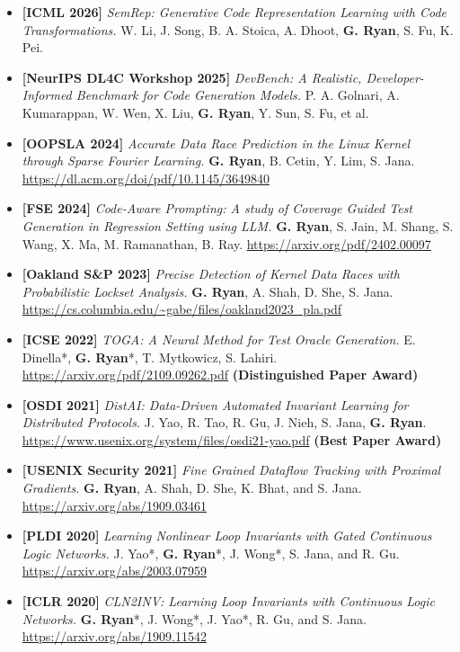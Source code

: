 \documentclass{article} %
\begin{document}
\hspace*{-0.1cm}
\begin{minipage}{1.01\linewidth}
\begin{itemize}[label={},itemindent=-2em,leftmargin=2em, parsep=5pt]
  \item {\bf [ICML 2026]}
    \textit{SemRep: Generative Code Representation Learning with Code Transformations.}
    W. Li, J. Song, B. A. Stoica, A. Dhoot, \textbf{G. Ryan}, S. Fu, K. Pei.
  \item {\bf [NeurIPS DL4C Workshop 2025]}
    \textit{DevBench: A Realistic, Developer-Informed Benchmark for Code Generation Models.}
    P. A. Golnari, A. Kumarappan, W. Wen, X. Liu, \textbf{G. Ryan}, Y. Sun, S. Fu, et al.
  \item {\bf [OOPSLA 2024]}
  \textit{Accurate Data Race Prediction in the Linux Kernel through Sparse Fourier Learning.} 
    \textbf{G. Ryan}, B. Cetin, Y. Lim, S. Jana. \url{https://dl.acm.org/doi/pdf/10.1145/3649840}
  \item {\bf [FSE 2024]}
    \textit{Code-Aware Prompting: A study of Coverage Guided Test Generation in Regression Setting using LLM.} 
      \textbf{G. Ryan}, S. Jain, M. Shang, S. Wang, X. Ma, M. Ramanathan, B. Ray. \url{https://arxiv.org/pdf/2402.00097}
  \item {\bf [Oakland S\&P 2023]}
  \textit{Precise Detection of Kernel Data Races with Probabilistic Lockset Analysis.}
    \textbf{G. Ryan}, A. Shah, D. She, S. Jana. \url{https://cs.columbia.edu/~gabe/files/oakland2023_pla.pdf}
  \item {\bf [ICSE 2022]}
    \textit{TOGA: A Neural Method for Test Oracle Generation.}
    E. Dinella*, \textbf{G. Ryan}*, T. Mytkowicz, S. Lahiri. \url{https://arxiv.org/pdf/2109.09262.pdf} \textbf{(Distinguished Paper Award)}
  \item {\bf [OSDI 2021]}
    \textit{DistAI: Data-Driven Automated Invariant Learning for Distributed Protocols.}
    J. Yao, R. Tao, R. Gu, J. Nieh, S. Jana, \textbf{G. Ryan}. \url{https://www.usenix.org/system/files/osdi21-yao.pdf} \textbf{(Best Paper Award)}
  \item {\bf [USENIX Security 2021]}
    \textit{Fine Grained Dataflow Tracking with Proximal Gradients.}
    \textbf{G. Ryan}, A. Shah, D. She, K. Bhat, and S. Jana. \url{https://arxiv.org/abs/1909.03461}
  \item {\bf [PLDI 2020]}
    \textit{Learning Nonlinear Loop Invariants with Gated Continuous Logic Networks.}
    J. Yao*, \textbf{G. Ryan}*, J. Wong*, S. Jana, and R. Gu. \url{https://arxiv.org/abs/2003.07959}
  \item {\bf [ICLR 2020]}
    \textit{CLN2INV: Learning Loop Invariants with Continuous Logic Networks.}
    \textbf{G. Ryan}*, J. Wong*, J. Yao*, R. Gu, and S. Jana. \url{https://arxiv.org/abs/1909.11542}
\end{itemize}
\end{minipage}
\end{document}
